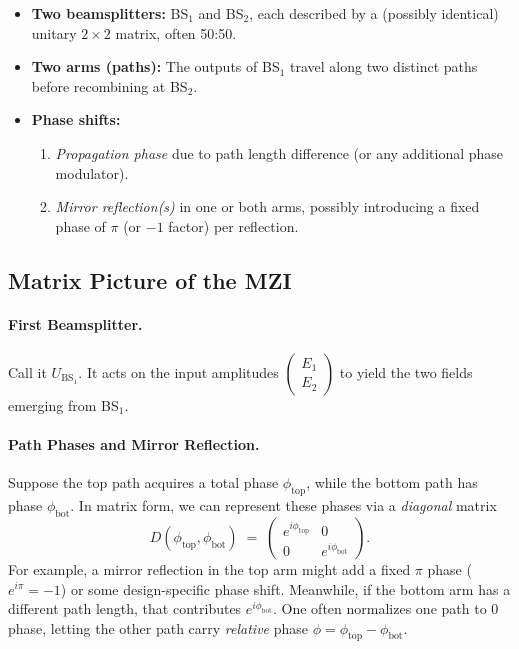 \documentclass[12pt]{article}
\begin{document}
\begin{itemize}
    \item \textbf{Two beamsplitters:} BS$_1$ and BS$_2$, each described by a (possibly identical) unitary $2\times 2$ matrix, often 50:50.
    \item \textbf{Two arms (paths):} The outputs of BS$_1$ travel along two distinct paths before recombining at BS$_2$.
    \item \textbf{Phase shifts:} 
    \begin{enumerate}
        \item \emph{Propagation phase} due to path length difference (or any additional phase modulator).
        \item \emph{Mirror reflection(s)} in one or both arms, possibly introducing a fixed phase of $\pi$ (or $-1$ factor) per reflection.
    \end{enumerate}
\end{itemize}

\subsection{Matrix Picture of the MZI}

\paragraph{First Beamsplitter.}
Call it $U_{\text{BS}_1}$.  It acts on the input amplitudes 
\(\begin{pmatrix} E_1 \\ E_2 \end{pmatrix}\)
to yield the two fields emerging from BS$_1$.

\paragraph{Path Phases and Mirror Reflection.}
Suppose the top path acquires a total phase $\phi_{\text{top}}$, while the bottom path has phase $\phi_{\text{bot}}$.  In matrix form, we can represent these phases via a \emph{diagonal} matrix
\begin{equation}
\label{eq:Dmatrix}
  D(\phi_{\text{top}}, \phi_{\text{bot}})
  \;=\;
  \begin{pmatrix}
    e^{i\phi_{\text{top}}} & 0 \\[4pt]
    0 & e^{i\phi_{\text{bot}}}
  \end{pmatrix}.
\end{equation}
For example, a mirror reflection in the top arm might add a fixed $\pi$ phase ($e^{i\pi} = -1$) or some design-specific phase shift.  Meanwhile, if the bottom arm has a different path length, that contributes $e^{i\phi_{\text{bot}}}$.  One often normalizes one path to 0 phase, letting the other path carry \emph{relative} phase $\phi = \phi_{\text{top}} - \phi_{\text{bot}}$.
\end{document}

